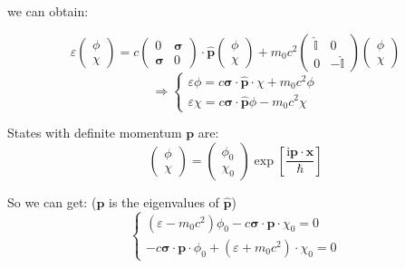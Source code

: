 we can obtain:

\begin{equation}
\varepsilon \begin{pmatrix} \phi \\ \chi \end{pmatrix} = c \begin{pmatrix} 0 & \bm{\sigma} \\ \bm{\sigma} & 0 \end{pmatrix} \cdot \hat{\bm{p}} \begin{pmatrix} \phi \\ \chi \end{pmatrix} + m_0 c^2 \begin{pmatrix} \hat{\mathbb{I}} & 0 \\ 0 & -\hat{\mathbb{I}} \end{pmatrix} \begin{pmatrix} \phi \\ \chi \end{pmatrix}
\end{equation}
\begin{equation}
\Rightarrow \begin{cases}
\varepsilon \phi = c \bm{\sigma} \cdot \hat{\bm{p}} \cdot \chi + m_0 c^2 \phi \\
\varepsilon \chi = c \bm{\sigma} \cdot \hat{\bm{p}} \phi - m_0 c^2 \chi
\end{cases}
\end{equation}

States with definite momentum $\bm{p}$ are:
\begin{equation}
\begin{pmatrix} \phi \\ \chi \end{pmatrix} = \begin{pmatrix} \phi_0 \\ \chi_0 \end{pmatrix} \exp\left[ \frac{\mathrm{i} \bm{p} \cdot \bm{x}}{\hbar} \right]
\end{equation}

So we can get: ($\bm{p}$ is the eigenvalues of $\hat{\bm{p}}$)
\begin{equation}
\begin{cases}
(\varepsilon - m_0 c^2) \phi_0 - c \bm{\sigma} \cdot \bm{p} \cdot \chi_0 = 0 \\
-c \bm{\sigma} \cdot \bm{p} \cdot \phi_0 + (\varepsilon + m_0 c^2) \cdot \chi_0 = 0
\end{cases}
\end{equation}

